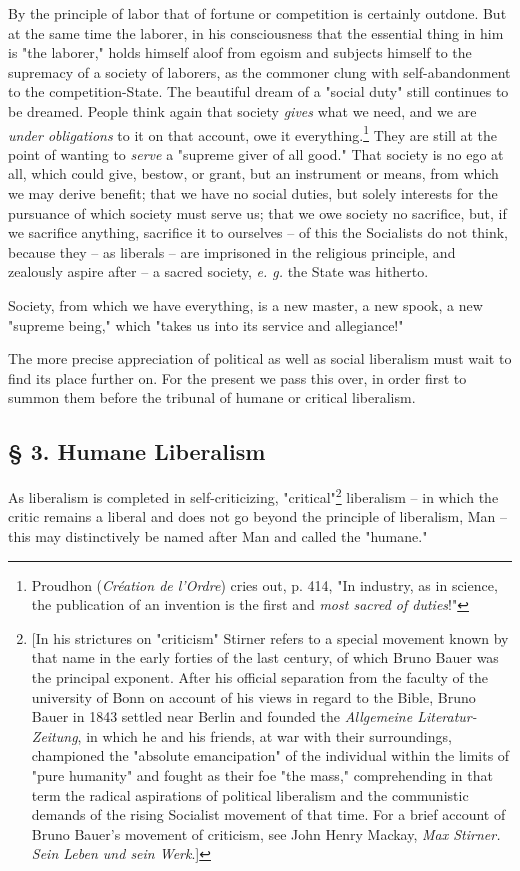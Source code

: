 \documentclass[a4paper]{book}
\begin{document}
By the principle of labor that of fortune or competition is certainly outdone. 
But at the same time the laborer, in his consciousness that the essential 
thing in him is "{}the laborer,"{} holds himself aloof from egoism and 
subjects himself to the supremacy of a society of laborers, as the commoner 
clung with self-abandonment to the competition-State. The beautiful dream of a 
"{}social duty"{} still continues to be dreamed. People think again that 
society \textit{gives} what we need, and we are \textit{under obligations} to 
it on that account, owe it everything.\footnote{Proudhon (\textit{Cr\'eation 
de l'Ordre}) cries out, p. 414, "{}In industry, as in science, the publication 
of an invention is the first and \textit{most sacred of duties}!"{}} They are 
still at the point of wanting to \textit{serve} a "{}supreme giver of all 
good."{} That society is no ego at all, which could give, bestow, or grant, 
but an instrument or means, from which we may derive benefit; that we have no 
social duties, but solely interests for the pursuance of which society must 
serve us; that we owe society no sacrifice, but, if we sacrifice anything, 
sacrifice it to ourselves -- of this the Socialists do not think, because they 
-- as liberals -- are imprisoned in the religious principle, and zealously 
aspire after -- a sacred society, \textit{e. g.} the State was hitherto.

Society, from which we have everything, is a new master, a new spook, a new 
"{}supreme being,"{} which "{}takes us into its service and allegiance!"{}

The more precise appreciation of political as well as social liberalism must 
wait to find its place further on. For the present we pass this over, in order 
first to summon them before the tribunal of humane or critical liberalism.

\subsection[\S{} 3. Humane Liberalism]{\centering \S{} 3. Humane Liberalism}

As liberalism is completed in self-criticizing, "{}critical"{}\footnote{[In 
his strictures on "{}criticism"{} Stirner refers to a special movement known 
by that name in the early forties of the last century, of which Bruno Bauer 
was the principal exponent. After his official separation from the faculty of 
the university of Bonn on account of his views in regard to the Bible, Bruno 
Bauer in 1843 settled near Berlin and founded the \textit{Allgemeine 
Literatur-Zeitung}, in which he and his friends, at war with their 
surroundings, championed the "{}absolute emancipation"{} of the individual 
within the limits of "{}pure humanity"{} and fought as their foe "{}the 
mass,"{} comprehending in that term the radical aspirations of political 
liberalism and the communistic demands of the rising Socialist movement of 
that time. For a brief account of Bruno Bauer's movement of criticism, see 
John Henry Mackay, \textit{Max Stirner. Sein Leben und sein Werk}.]} 
liberalism -- in which the critic remains a liberal and does not go beyond the 
principle of liberalism, Man -- this may distinctively be named after Man and 
called the "{}humane."{}
\end{document}

